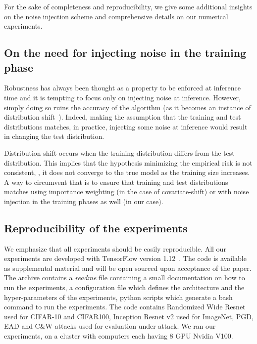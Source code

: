 For the sake of completeness and reproducibility, we give some additional insights on the noise injection scheme and comprehensive details on our numerical experiments.

\subsection{On the need for injecting noise in the training phase}
\label{section:ap3-covariateshift-appendix}

Robustness has always been thought as a property to be enforced at inference time and it is tempting to focus only on injecting noise at inference.
However, simply doing so ruins the accuracy of the algorithm (as it becomes an instance of distribution shift~\cite{sugiyama2012machine}).
Indeed, making the assumption that the training and test distributions matches, in practice, injecting some noise at inference would result in changing the test distribution.

Distribution shift occurs when the training distribution differs from the test distribution.
This implies that the hypothesis minimizing the empirical risk is not consistent, \ie, it does not converge to the true model as the training size increases.
A way to circumvent that is to ensure that training and test distributions matches using importance weighting (in the case of covariate-shift) or with noise injection in the training phases as well (in our case).


\subsection{Reproducibility of the  experiments}

We emphasize that all experiments should be easily reproducible.
All our experiments are developed with TensorFlow version 1.12~\cite{tensorflow2015-whitepaper}.
The code is available as supplemental material and will be open sourced upon acceptance of the paper.
The archive contains a \emph{readme} file containing a small documentation on how to run the experiments, a configuration file which defines the architecture and the hyper-parameters of the experiments, python scripts which generate a bash command to run the experiments.
The code contains Randomized Wide Resnet used for CIFAR-10 and CIFAR100, Inception Resnet v2 used for ImageNet, PGD, EAD and C\&W attacks used for evaluation under attack.
We ran our experiments, on a cluster with computers each having 8 GPU Nvidia V100. 








